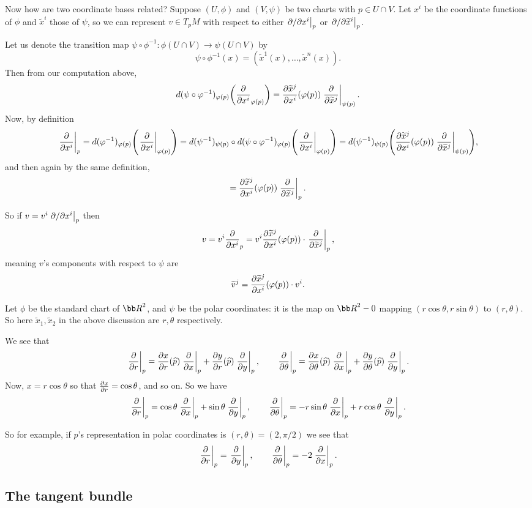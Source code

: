 \eprop

Now how are two coordinate bases related?
Suppose $(U,\phi)$ and $(V,\psi)$ be two charts with $p\in U\cap V$.
Let $x^i$ be the coordinate functions of $\phi$ and $\tilde x^i$ those of $\psi$, so we can represent $v\in T_pM$ with respect to either
$\ievpdv{x^i}_p$ or $\ievpdv{\tilde x^i}_p$.

Let us denote the transition map $\psi\circ\phi^{-1}\colon\phi(U\cap V)\to\psi(U\cap V)$ by
$$ \psi\circ\phi^{-1}(x) = (\tilde x^1(x),\dots,\tilde x^n(x)) . $$
Then from our computation above,
$$ d(\psi\circ\phi^{-1})_{\phi(p)}\parens{\pdv{x^i}_{\phi(p)}} = \pdvof{\tilde x^j}{x^i}(\phi(p))\evpdv{\tilde x^j}_{\psi(p)} . $$
Now, by definition
$$ \evpdv{x^i}_p = d(\phi^{-1})_{\phi(p)}\parens{\evpdv{x^i}_{\phi(p)}} = d(\psi^{-1})_{\psi(p)}\circ d(\psi\circ\phi^{-1})_{\phi(p)}\parens{\evpdv{x^i}_{\phi(p)}}
= d(\psi^{-1})_{\psi(p)}\parens{\pdvof{\tilde x^j}{x^i}(\phi(p))\evpdv{\tilde x^j}_{\psi(p)}} , $$
and then again by the same definition,
$$ = \pdvof{\tilde x^j}{x^i}(\phi(p))\evpdv{\tilde x^j}_p . $$

So if $v=v^i\ievpdv{x^i}_p$ then
$$ v = v^i\pdv{x^i}_p = v^i\pdvof{\tilde x^j}{x^i}(\phi(p))\cdot\evpdv{\tilde x^j}_p , $$
meaning $v$'s components with respect to $\psi$ are
$$ \tilde v^j = \pdvof{\tilde x^j}{x^i}(\phi(p))\cdot v^i . $$

\bexam

    Let $\phi$ be the standard chart of $\bR^2$, and $\psi$ be the {\emphcolor polar coordinates}: it is the map on $\bR^2-0$ mapping $(r\cos\theta,r\sin\theta)$
    to $(r,\theta)$.
    So here $\tilde x_1,\tilde x_2$ in the above discussion are $r,\theta$ respectively.

    We see that
    $$ \evpdv r_p = \pdvof xr(\hat p)\evpdv x_p + \pdvof yr(\hat p)\evpdv y_p,\qquad \evpdv\theta_p = \pdvof x\theta(\hat p)\evpdv x_p + \pdvof y\theta(\hat p)\evpdv y_p . $$
    Now, $x=r\cos\theta$ so that $\pdvof xr=\cos\theta$, and so on.
    So we have
    $$ \evpdv r_p = \cos\theta\evpdv x_p + \sin\theta\evpdv y_p,\qquad \evpdv\theta_p = -r\sin\theta\evpdv x_p + r\cos\theta\evpdv y_p . $$

    So for example, if $p$'s representation in polar coordinates is $(r,\theta)=(2,\pi/2)$ we see that
    $$ \evpdv r_p = \evpdv y_p,\qquad \evpdv\theta_p = -2\evpdv x_p . $$

\eexam

\subsection{The tangent bundle}

